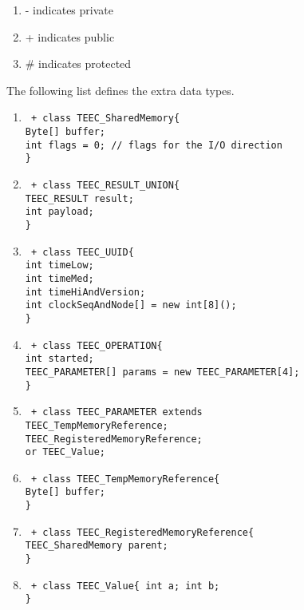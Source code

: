 \documentclass{cseminar}
\begin{document}
\begin{enumerate}
	\item[] - indicates private
	\item[] + indicates public
	\item[] \# indicates protected
\end{enumerate}
The following list defines the extra data types.
\begin{enumerate}
	\item \texttt{
		+ class TEEC\_SharedMemory\{
		\\ Byte[] buffer;
		\\ int flags = 0; // flags for the I/O direction
		\\\}
	}
	\item \texttt{
		+ class TEEC\_RESULT\_UNION\{
			\\ TEEC\_RESULT result;
			\\ int payload;
		\\\}
	}
	\item \texttt{
		+ class TEEC\_UUID\{
			\\ int timeLow;
			\\ int timeMed;
			\\ int timeHiAndVersion;
			\\ int clockSeqAndNode[] = new int[8]();		
		\\\}	
	}
	\item \texttt{
		+ class TEEC\_OPERATION\{
			\\ int started;
			\\ TEEC\_PARAMETER[] params = new TEEC\_PARAMETER[4];		
		\\\}	
	}
	\item \texttt{
		+ class TEEC\_PARAMETER extends
			\\ TEEC\_TempMemoryReference;
			\\ TEEC\_RegisteredMemoryReference;
			\\or TEEC\_Value;
	}
	\item \texttt{
		+ class TEEC\_TempMemoryReference\{
			\\ Byte[] buffer;	
		\\\}	
	}
	\item \texttt{
		+ class TEEC\_RegisteredMemoryReference\{
			\\ TEEC\_SharedMemory parent;
		\\\}	
	}
	\item \texttt{
		+ class TEEC\_Value\{
			int a;
			int b;		
		\\\}	
	}
\end{enumerate}
\end{document}
